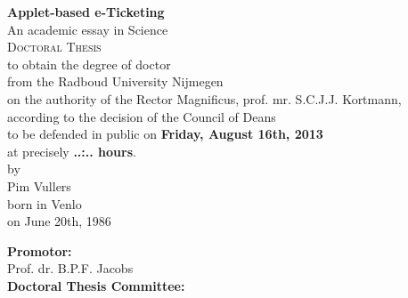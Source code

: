 \begin{center}
  \thispagestyle{empty}

  \textbf{\Large Applet-based e-Ticketing}\\[15mm]

  An academic essay in Science \\[15mm]

  \textsc{Doctoral Thesis} \\[15mm]

  to obtain the degree of doctor \\
  from the Radboud University Nijmegen \\
  on the authority of the Rector Magnificus, prof. mr. S.C.J.J. Kortmann, \\
  according to the decision of the Council of Deans \\
  to be defended in public on \textbf{Friday, August 16th, 2013} \\
  at precisely \textbf{..:.. hours}. \\[30mm]

  by \\[30mm]

  Pim Vullers \\[15mm]

  born in Venlo \\
  on June 20th, 1986
\end{center}

\clearpage

\begin{flushleft}
  \thispagestyle{empty}

  \textbf{Promotor:} \\
  \indent Prof. dr. B.P.F. Jacobs \\[15mm]

  \textbf{Doctoral Thesis Committee:}
\end{flushleft}